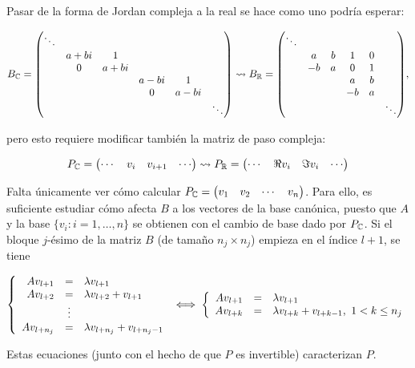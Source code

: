 \documentclass[../ecuaciones_diferenciales.tex]{subfiles}
\begin{document}
Pasar de la forma de Jordan compleja a la real se hace como uno podría
esperar:

\[B_\Complex =
	\mat{\ddots &      &      &      &      &         \\
		& a+bi & 1    &      &      &         \\
		& 0    & a+bi &      &      &         \\
		&      &      & a-bi & 1    &         \\
		&      &      & 0    & a-bi &         \\
		&      &      &      &      & \ddots} \leadsto
	B_\R =
	\mat{\ddots &    &   &    &      &         \\
		& a  & b & 1  & 0 &         \\
		& -b & a & 0  & 1 &         \\
		&    &   & a  & b &         \\
		&    &   & -b & a &         \\
		&    &   &    &   & \ddots},
\]

pero esto requiere modificar también la matriz de paso compleja:

\[P_{\mathbb{C}} =
	\begin{pmatrix}\cdots & v_i & v_{i+1} & \cdots\end{pmatrix} \leadsto
	P_{\mathbb{R}} =
	\begin{pmatrix}\cdots & \Re v_i & \Im v_i & \cdots\end{pmatrix}\]

Falta únicamente ver cómo calcular
\(P_{\mathbb{C}} = \begin{pmatrix}v_1 & v_2 & \cdots & v_n\end{pmatrix}\). Para ello, es suficiente
estudiar cómo afecta \(B\) a los vectores de la base canónica, puesto que
\(A\) y la base \(\{v_i : i = 1, \dots, n\}\) se obtienen con el cambio de
base dado por \(P_{\mathbb{C}}\). Si el bloque \(j\)-ésimo de la matriz \(B\) (de
tamaño \(n_j \times n_j\)) empieza en el índice \(l+1\), se tiene

\[\left\{
	\begin{array}[ht]{r c l}
		Av_{l+1}    & =      & \lambda v_{l+1}                 \\
		Av_{l+2}    & =      & \lambda v_{l+2} + v_{l+1}       \\
		            & \vdots &                                 \\
		A v_{l+n_j} & =      & \lambda v_{l+n_j} + v_{l+n_j-1}
	\end{array} \right. \iff
	\left\{
	\begin{array}[ht]{r c l}
		Av_{l+1} & = & \lambda v_{l+1}                               \\
		Av_{l+k} & = & \lambda v_{l+k} + v_{l+k-1}, \ 1 < k \leq n_j \\
	\end{array}
	\right.\]

Estas ecuaciones (junto con el hecho de que \(P\) es invertible)
caracterizan \(P\).
\end{document}
